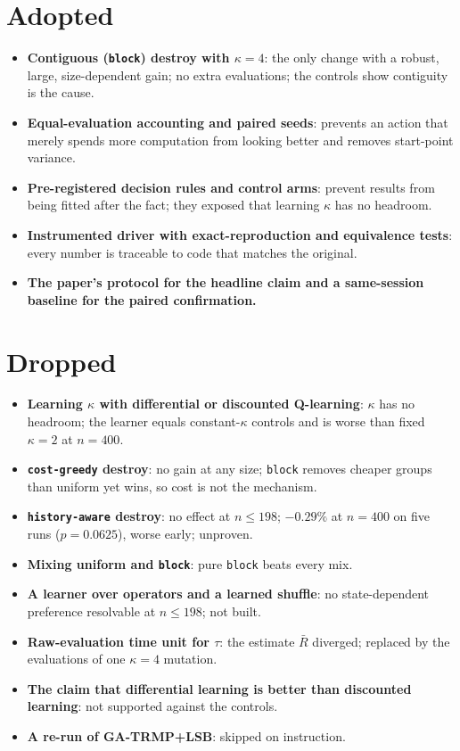 \section*{Adopted}

\begin{itemize}
\item \textbf{Contiguous (\texttt{block}) destroy with $\kappa=4$}: the only change with a robust, large, size-dependent gain; no extra evaluations; the controls show contiguity is the cause.
\item \textbf{Equal-evaluation accounting and paired seeds}: prevents an action that merely spends more computation from looking better and removes start-point variance.
\item \textbf{Pre-registered decision rules and control arms}: prevent results from being fitted after the fact; they exposed that learning $\kappa$ has no headroom.
\item \textbf{Instrumented driver with exact-reproduction and equivalence tests}: every number is traceable to code that matches the original.
\item \textbf{The paper's protocol for the headline claim and a same-session baseline for the paired confirmation.}
\end{itemize}

\section*{Dropped}

\begin{itemize}
\item \textbf{Learning $\kappa$ with differential or discounted Q-learning}: $\kappa$ has no headroom; the learner equals constant-$\kappa$ controls and is worse than fixed $\kappa=2$ at $n=400$.
\item \textbf{\texttt{cost-greedy} destroy}: no gain at any size; \texttt{block} removes cheaper groups than uniform yet wins, so cost is not the mechanism.
\item \textbf{\texttt{history-aware} destroy}: no effect at $n\le198$; $-0.29\%$ at $n=400$ on five runs ($p=0.0625$), worse early; unproven.
\item \textbf{Mixing uniform and \texttt{block}}: pure \texttt{block} beats every mix.
\item \textbf{A learner over operators and a learned shuffle}: no state-dependent preference resolvable at $n\le198$; not built.
\item \textbf{Raw-evaluation time unit for $\tau$}: the estimate $\bar R$ diverged; replaced by the evaluations of one $\kappa=4$ mutation.
\item \textbf{The claim that differential learning is better than discounted learning}: not supported against the controls.
\item \textbf{A re-run of GA-TRMP+LSB}: skipped on instruction.
\end{itemize}

